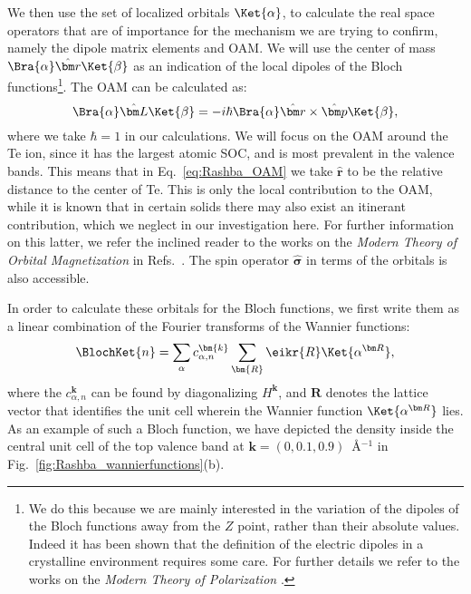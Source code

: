 We then use the set of localized orbitals $\Ket{\alpha}$, to calculate the real space operators that are of importance for the mechanism we are trying to confirm, namely the dipole matrix elements and \gls{OAM}.
We will use the center of mass $\Bra{\alpha} \hat{\bm r} \Ket{\beta}$ as an indication of the local dipoles of the Bloch functions\footnote{We do this because we are mainly interested in the variation of the dipoles of the Bloch functions away from the $Z$ point, rather than their absolute values. Indeed it has been shown that the definition of the electric dipoles in a crystalline environment requires some care. For further details we refer to the works on the {\it Modern Theory of Polarization} \cite{King-Smith1993,Vanderbilt1993,Resta1998, Spaldin2012,Vanderbilt18}.}.
The \gls{OAM} can be calculated as:
\begin{equation}
	\label{eq:Rashba_OAM}
	\Bra{\alpha}\hat{\bm L}\Ket{\beta} = -i\hbar \Bra{\alpha} \hat{\bm r} \times \hat{\bm p} \Ket{\beta},
\end{equation}
where we take $\hbar = 1$ in our calculations.
We will focus on the \gls{OAM} around the Te ion, since it has the largest atomic \gls{SOC}, and is most prevalent in the valence bands. This means that in Eq.~\eqref{eq:Rashba_OAM} we take $\hat{\bm r}$ to be the relative distance to the center of Te.
This is only the local contribution to the \gls{OAM}, while it is known that in certain solids there may also exist an itinerant contribution, which we neglect in our investigation here. For further information on this latter, we refer the inclined reader to the works on the {\it Modern Theory of Orbital Magnetization} in Refs.~\cite{Thonhauser2005OrbitalInsulators,Ceresoli2006OrbitalMetals,Thonhauser2011,Vanderbilt18}.
The spin operator $\hat{\bm \sigma}$ in terms of the orbitals is also accessible.

In order to calculate these orbitals for the Bloch functions, we first write them as a linear combination of the Fourier transforms of the Wannier functions:
\begin{equation}
	\label{eq:Rashba_blochfromwan}
	\BlochKet{n} = \sum_{\alpha} c_{\alpha, n}^{\bm{k}}\sum_{\bm{R}} \eikr{R}\Ket{\alpha^{\bm R}},
\end{equation}
where the $c_{\alpha,n}^{\bm{k}}$ can be found by diagonalizing $H^{\bm k}$, and $\bm R$ denotes the lattice vector that identifies the unit cell wherein the Wannier function $\Ket{\alpha^{\bm R}}$ lies.
As an example of such a Bloch function, we have depicted the density inside the central unit cell of the top valence band at $\bm k = (0, 0.1, 0.9)$~\AA$^{-1}$ in Fig.~\ref{fig:Rashba_wannierfunctions}(b).

